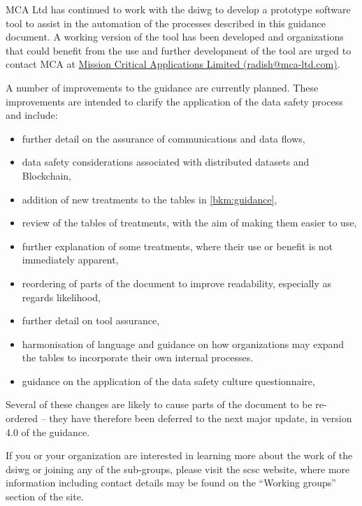 MCA Ltd has continued to work with the \gls{dsiwg} to develop a prototype software tool to assist in the automation of the processes described in this guidance document.
A working version of the tool has been developed and organizations that could benefit from the use and further development of the tool are urged to contact MCA at \href{mailto:radish@mca-ltd.com}{Mission Critical Applications Limited (radish@mca-ltd.com)}.

A number of improvements to the guidance are currently planned.
These improvements are intended to clarify the application of the data safety process
and include:
\begin{itemize}
\item further detail on the assurance of communications and data flows,
\item data safety considerations associated with distributed \glspl{dataset} and Blockchain,
\item addition of new \glspl{treatment} to the tables in \autoref{bkm:guidance},
\item review of the tables of \glspl{treatment}, with the aim of making them easier to use,
\item further explanation of some \glspl{treatment}, where their use or benefit is not immediately apparent, 
\item reordering of parts of the document to improve readability, especially as regards likelihood, 
\item further detail on tool assurance,
\item harmonisation of language and guidance on how organizations may expand the tables to incorporate their own internal processes.
\item guidance on the application of the data safety culture questionnaire,
\end{itemize}
Several of these changes are likely to
cause parts of the document to be re-ordered -- they have therefore been deferred to the next major update, in version 4.0 of the guidance.

If you or your organization are interested in learning more about the work of the \gls{dsiwg} or joining any of the sub-groups,
please visit the \gls{scsc} website, where more information including contact details may be found on the ``Working groups'' section of the site.
%
%
%

